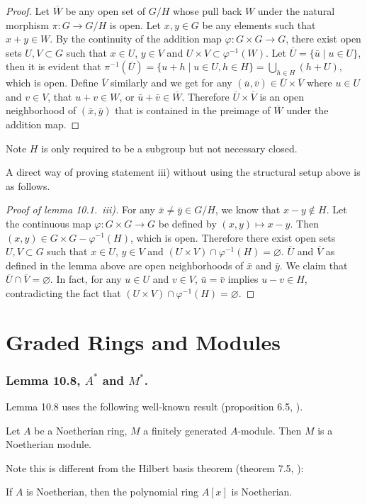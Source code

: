 \documentclass{note}
\begin{document}
\begin{proof}
  Let $\overline{W}$ be any open set of $G/H$ whose pull back $W$
  under the natural morphism $\pi\colon G \to G/H$ is open. Let
  $x,y \in G$ be any elements such that $x + y \in W$. By the
  continuity of the addition map $\varphi\colon G \times G \to G$,
  there exist open sets $U,V \subset G$ such that $x\in U$, $y\in V$
  and $U\times V \subset \varphi^{-1}(W)$. Let
  $\overline{U} = \{\bar{u} \mid u \in U\}$, then it is evident that
  $\pi^{-1}\left(\overline{U}\right) = \{u+h \mid u \in U, h \in H\} =
  \bigcup_{h\in H}(h+U)$, which is open. Define $\overline{V}$
  similarly and we get for any
  $(\bar{u},\bar{v}) \in \overline{U}\times\overline{V}$ where
  $u \in U$ and $v \in V$, that $u + v \in W$, or
  $\bar{u} + \bar{v} \in \overline{W}$. Therefore
  $\overline{U} \times \overline{V}$ is an open neighborhood of
  $(\bar{x},\bar{y})$ that is contained in the preimage of
  $\overline{W}$ under the addition map.
\end{proof}

\begin{remark*}
  Note $H$ is only required to be a subgroup but not necessary closed.
\end{remark*}

A direct way of proving statement iii) without using the structural
setup above is as follows.

\begin{proof}[Proof of lemma 10.1.~iii)] For any
  $\bar{x} \neq \bar{y} \in G/H$, we know that $x - y \notin H$. Let
  the continuous map $\varphi\colon G\times G \to G$ be defined by
  $(x,y) \mapsto x - y$. Then $(x,y) \in G\times G - \varphi^{-1}(H)$,
  which is open. Therefore there exist open sets $U,V \subset G$ such
  that $x\in U$, $y\in V$ and
  $(U\times V) \cap \varphi^{-1}(H) = \varnothing$. $\overline{U}$ and
  $\overline{V}$ as defined in the lemma above are open neighborhoods
  of $\bar{x}$ and $\bar{y}$. We claim that
  $\overline{U} \cap \overline{V} = \varnothing$. In fact, for any
  $u\in U$ and $v\in V$, $\bar{u} = \bar{v}$ implies
  $u - v \in H$, contradicting the fact that
  $(U\times V) \cap \varphi^{-1}(H) = \varnothing$.  
\end{proof}

\section*{Graded Rings and Modules}
\subsubsection*{Lemma 10.8, $A^*$ and $M^*$.}
Lemma 10.8 uses the following well-known result (proposition 6.5,
).
\begin{proposition*}
  Let $A$ be a Noetherian ring, $M$ a finitely generated
  $A$-module. Then $M$ is a Noetherian module.
\end{proposition*}
Note this is different from the Hilbert basis theorem (theorem 7.5,
):
\begin{theorem*}
  If $A$ is Noetherian, then the polynomial ring $A[x]$ is Noetherian.
\end{theorem*}
\end{document}
